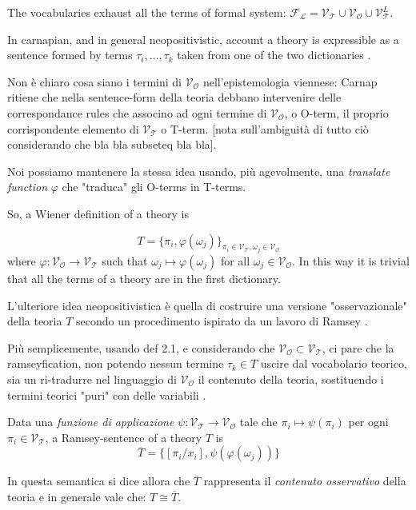 The vocabularies exhaust all the terms of formal system: $\mathcal{F_L} = \mathcal{V_T} \cup \mathcal{V_O} \cup \mathcal{V}_{\mathcal{T}}^L$.

In carnapian, and in general neopositivistic, account a theory is expressible as a sentence formed by terms $\tau_i, \dots, \tau_k$ taken from one of the two dictionaries \cite{?}. 

Non è chiaro cosa siano i termini di $\mathcal{V_O}$ nell'epistemologia viennese: Carnap ritiene che nella sentence-form della teoria debbano intervenire delle correspondance rules che associno ad ogni termine di $\mathcal{V_O}$, o O-term, il proprio corrispondente elemento di $\mathcal{V_T}$ o T-term. [nota sull'ambiguità di tutto ciò considerando che bla bla subseteq bla bla].

Noi possiamo mantenere la stessa idea usando, più agevolmente, una \emph{translate function} $\varphi$ che "traduca" gli O-terms in T-terms. 

So, a Wiener definition of a theory is 

\[  T = \{ \pi_i, \varphi (\omega_j)\}_{\pi_i \in \mathcal{V_T}, \omega_j \in \mathcal{V_O}}
\] 
where $\varphi: \mathcal{V_O} \to \mathcal{V_T}$ such that $\omega_j \mapsto \varphi (\omega_j)$ for all $\omega_j \in \mathcal{V_O}$. In this way it is trivial that all the terms of a theory are in the first dictionary.

L'ulteriore idea neopositivistica è quella di costruire una versione "osservazionale" della teoria $T$ secondo un procedimento ispirato da un lavoro di Ramsey \cite{?}.


Più semplicemente, usando def 2.1, e considerando che $\mathcal{V_O} \subset \mathcal{V_T}$, ci pare che la ramseyfication, non potendo nessun termine $\tau_k \in T$ uscire dal vocabolario teorico, sia un ri-tradurre nel linguaggio di $\mathcal{V_O}$ il contenuto della teoria, sostituendo i termini teorici "puri" con delle variabili \cite{?}.
\begin{definition}
	Data una \emph{funzione di applicazione} $\psi: \mathcal{V_T} \to \mathcal{V_O}$ tale che $\pi_i \mapsto \psi (\pi_i) $ per ogni $\pi_i \in \mathcal{V_T}$, a Ramsey-sentence of a theory $T$ is 
	\[ \overline{T} = \{[\pi_i/x_i], \psi (\varphi (\omega_j))\} 
	\]
\end{definition}

In questa semantica si dice allora che $\overline{T}$ rappresenta il \emph{contenuto osservativo} della teoria e in generale vale che: $T \cong \overline{T}$. 



